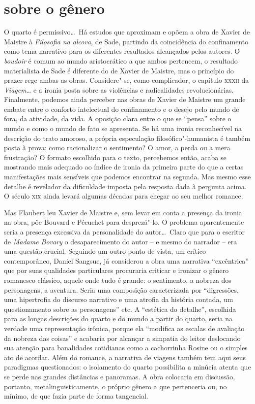 \section{sobre o gênero}

O quarto é permissivo\ldots\  Há estudos que aproximam e opõem a obra de
Xavier de Maistre à \textit{Filosofia na alcova}, de Sade, partindo da
coincidência do confinamento como tema narrativo para os diferentes
resultados alcançados pelos autores. O \textit{boudoir} é comum ao
mundo aristocrático a que ambos pertencem, o resultado materialista de
Sade é diferente do de Xavier de Maistre, mas o princípio do prazer
rege ambas as obras. Considere"-se, como complicador, o capítulo \textsc{xxxii}
da \textit{Viagem\ldots} e a ironia posta sobre as violências e
radicalidades revolucionárias. Finalmente, podemos ainda perceber nas
obras de Xavier de Maistre um grande embate entre o conforto
intelectual do confinamento e o desejo pelo mundo de fora, da
atividade, da vida. A oposição clara entre o que se ``pensa'' sobre o
mundo e como o mundo de fato se apresenta. Se há uma ironia
reconhecível na descrição do trato amoroso, a própria especulação
filosófico"-humanista é também posta à prova: como racionalizar o
sentimento? O amor, a perda ou a mera frustração? O formato escolhido
para o texto, percebemos então, acaba se mostrando mais adequado ao
índice de ironia da primeira parte do que a certas manifestações mais
sensíveis que podemos encontrar na segunda. Mas mesmo esse detalhe é
revelador da dificuldade imposta pela resposta dada à pergunta acima. O
século \textsc{xix} ainda levará algumas décadas para chegar ao seu melhor
romance.

Mas Flaubert leu Xavier de Maistre e, sem levar em conta a presença da
ironia na obra, põe Bouvard e Pécuchet para desprezá"-lo. O problema
aparentemente seria a presença excessiva da personalidade do autor\ldots\
Claro que para o escritor de \textit{Madame Bovary} o desaparecimento
do autor -- e mesmo do narrador -- era uma questão crucial. Seguindo
um outro ponto de vista, um crítico contemporâneo, Daniel Sangsue, já considerou a obra
uma narrativa ``excêntrica'' que por suas qualidades particulares
procuraria criticar e ironizar o gênero romanesco clássico, aquele onde
tudo é grande: o sentimento, a nobreza dos personagens, a aventura.
Seria uma composição caracterizada por ``digressões, uma hipertrofia do
discurso narrativo e uma atrofia da história contada, um questionamento
sobre as personagens'' etc. A ``estética do detalhe'', escolhida para as
longas descrições do quarto e do mundo a partir do quarto, seria na
verdade uma representação irônica, porque ela ``modifica as escalas de
avaliação da nobreza das coisas'' e acabaria por alcançar a simpatia do
leitor deslocando sua atenção para banalidades cotidianas como a
cachorrinha Rosine ou o simples ato de acordar. Além do romance, a
narrativa de viagens também tem aqui seus paradigmas questionados: o
isolamento do quarto possibilita a minúcia atenta que se perde nas
grandes distâncias e panoramas. A obra colocaria em discussão,
portanto, metalinguisticamente, o próprio gênero a que pertenceria ou,
no mínimo, de que fazia parte de forma tangencial.

